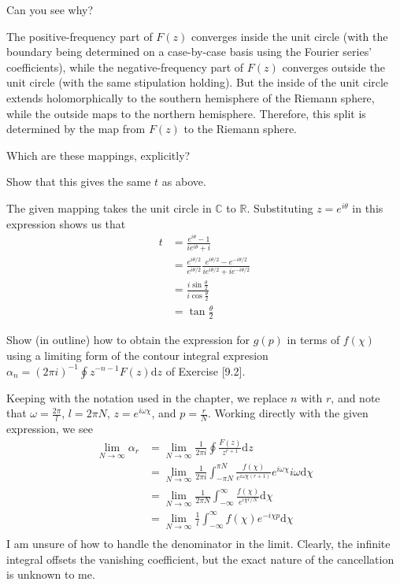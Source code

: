 \documentclass[../the-road-to-reality.tex]{subfiles}
\begin{document}
\begin{questions}
\question Can you see why?

\begin{solution}
	The positive-frequency part of $F(z)$ converges inside the unit circle (with the boundary being determined on a case-by-case basis using the Fourier series' coefficients), while the negative-frequency part of $F(z)$ converges outside the unit circle (with the same stipulation holding). But the inside of the unit circle extends holomorphically to the southern hemisphere of the Riemann sphere, while the outside maps to the northern hemisphere. Therefore, this split is determined by the map from $F(z)$ to the Riemann sphere.
\end{solution}

\question Which are these mappings, explicitly?

\question Show that this gives the same $t$ as above.

\begin{solution}
	The given mapping takes the unit circle in $\mathbb{C}$ to $\mathbb{R}$. Substituting $z = e^{i\theta}$ in this expression shows us that
	\begin{align*}
		t &= \frac{e^{i\theta} - 1}{ie^{i\theta} + i} \\
		&= \frac{e^{i\theta/2}}{e^{i\theta/2}}\frac{e^{i\theta/2} - e^{-i\theta/2}}{ie^{i\theta/2} + ie^{-i\theta/2}} \\
		&= \frac{i\sin\frac{\theta}{2}}{i\cos\frac{\theta}{2}} \\
		&= \tan\frac{\theta}{2}
	\end{align*}
\end{solution}

\question Show (in outline) how to obtain the expression for $g(p)$ in terms of $f(\chi)$ using a limiting form of the contour integral expresion $\alpha_n = (2\pi{i})^{-1}\oint{z^{-n-1}}F(z)\mathrm{d}z$ of Exercise [9.2].

\begin{solution}
	Keeping with the notation used in the chapter, we replace $n$ with $r$, and note that $\omega = \frac{2\pi}{l}$, $l = 2\pi{N}$, $z = e^{i\omega\chi}$, and $p = \frac{r}{N}$. Working directly with the given expression, we see
	\begin{align*}
		\lim_{N\to\infty}\alpha_r &= \lim_{N\to\infty}\frac{1}{2\pi{i}}\oint\frac{F(z)}{z^{r+1}}\mathrm{d}z \\
		&= \lim_{N\to\infty}\frac{1}{2\pi{i}}\int_{-\pi{N}}^{\pi{N}}\frac{f(\chi)}{e^{i\omega\chi(r+1)}}e^{i\omega\chi}i\omega\mathrm{d}\chi \\
		&= \lim_{N\to\infty}\frac{1}{2\pi{N}}\int_{-\infty}^{\infty}\frac{f(\chi)}{e^{i\chi{r}/N}}\mathrm{d}\chi \\
		&= \lim_{N\to\infty}\frac{1}{l}\int_{-\infty}^{\infty}f(\chi)e^{-i\chi{p}}\mathrm{d}\chi \\
	\end{align*}
	I am unsure of how to handle the denominator in the limit. Clearly, the infinite integral offsets the vanishing coefficient, but the exact nature of the cancellation is unknown to me.
\end{solution}


\end{questions}
\end{document}
